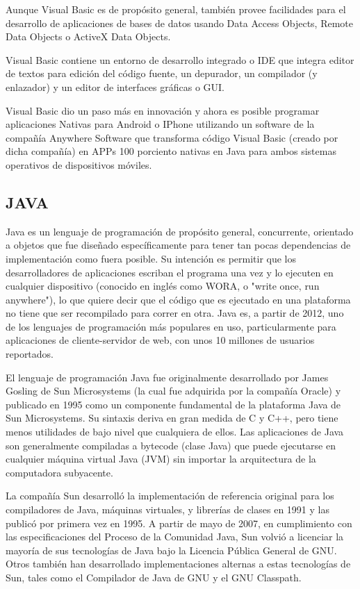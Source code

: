 \documentclass[twoside,twocolumn]{article}
\begin{document}
Aunque Visual Basic es de propósito general, también provee facilidades para el desarrollo de aplicaciones de bases de datos usando Data Access Objects, Remote Data Objects o ActiveX Data Objects.

Visual Basic contiene un entorno de desarrollo integrado o IDE que integra editor de textos para edición del código fuente, un depurador, un compilador (y enlazador) y un editor de interfaces gráficas o GUI.

Visual Basic dio un paso más en innovación y ahora es posible programar aplicaciones Nativas para Android o IPhone utilizando un software de la compañía Anywhere Software que transforma código Visual Basic (creado por dicha compañía) en APPs 100 porciento nativas en Java para ambos sistemas operativos de dispositivos móviles.

\subsection{JAVA}

Java es un lenguaje de programación de propósito general, concurrente, orientado a objetos que fue diseñado específicamente para tener tan pocas dependencias de implementación como fuera posible. Su intención es permitir que los desarrolladores de aplicaciones escriban el programa una vez y lo ejecuten en cualquier dispositivo (conocido en inglés como WORA, o "write once, run anywhere"), lo que quiere decir que el código que es ejecutado en una plataforma no tiene que ser recompilado para correr en otra. Java es, a partir de 2012, uno de los lenguajes de programación más populares en uso, particularmente para aplicaciones de cliente-servidor de web, con unos 10 millones de usuarios reportados.

El lenguaje de programación Java fue originalmente desarrollado por James Gosling de Sun Microsystems (la cual fue adquirida por la compañía Oracle) y publicado en 1995 como un componente fundamental de la plataforma Java de Sun Microsystems. Su sintaxis deriva en gran medida de C y C++, pero tiene menos utilidades de bajo nivel que cualquiera de ellos. Las aplicaciones de Java son generalmente compiladas a bytecode (clase Java) que puede ejecutarse en cualquier máquina virtual Java (JVM) sin importar la arquitectura de la computadora subyacente.

La compañía Sun desarrolló la implementación de referencia original para los compiladores de Java, máquinas virtuales, y librerías de clases en 1991 y las publicó por primera vez en 1995. A partir de mayo de 2007, en cumplimiento con las especificaciones del Proceso de la Comunidad Java, Sun volvió a licenciar la mayoría de sus tecnologías de Java bajo la Licencia Pública General de GNU. Otros también han desarrollado implementaciones alternas a estas tecnologías de Sun, tales como el Compilador de Java de GNU y el GNU Classpath.
\end{document}
